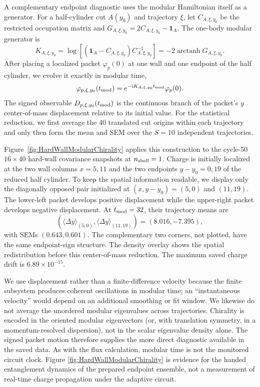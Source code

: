 \documentclass[aps,prb,twocolumn,superscriptaddress,longbibliography,floatfix]{revtex4-2}
\newcommand{\ii}{\mathrm{i}}
\theoremstyle{plain}
\theoremstyle{definition}
\theoremstyle{remark}
\begin{document}
A complementary endpoint diagnostic uses the modular Hamiltonian itself as a
generator.  For a half-cylinder cut $A(y_0)$ and trajectory $\xi$, let
$C_{A,\xi,y_0}$ be the restricted occupation matrix and
$G_{A,\xi,y_0}=2C_{A,\xi,y_0}-\mathbf{1}_A$.  The one-body modular generator is
\begin{equation}
 K_{A,\xi,y_0}
 =\log\!\left[(\mathbf{1}_A-C_{A,\xi,y_0})
 C_{A,\xi,y_0}^{-1}\right]
 =-2\operatorname{arctanh}G_{A,\xi,y_0}.
 \label{eq:EndpointModularGenerator}
\end{equation}
After placing a localized packet $\varphi_p(0)$ at one wall and one endpoint
of the half cylinder, we evolve it exactly in modular time,
\begin{equation}
 \varphi_{p,\xi,y_0}(t_{\rm mod})
 =e^{-\ii K_{A,\xi,y_0}t_{\rm mod}}\varphi_p(0).
 \label{eq:EndpointModularPacketEvolution}
\end{equation}
The signed observable $D_{p,\xi,y_0}(t_{\rm mod})$ is the continuous branch of
the packet's $y$ center-of-mass displacement relative to its initial value.
For the statistical reduction, we first average the 40 translated cut origins
within each trajectory and only then form the mean and SEM over the $S=10$
independent trajectories.

Figure~\ref{fig:HardWallModularChirality} applies this construction to the
cycle-50 $16\times40$ hard-wall covariance snapshots at
$n_{\rm shell}=1$.  Charge is initially localized at the two wall columns
$x=5,11$ and the two endpoints $y-y_0=0,19$ of the reduced half cylinder.
To keep the spatial information readable, we display only the diagonally
opposed pair initialized at $(x,y-y_0)=(5,0)$ and $(11,19)$.  The lower-left
packet develops positive displacement while the upper-right packet develops
negative displacement.  At $t_{\rm mod}=32$, their trajectory means are
\begin{equation}
 (\langle\Delta y\rangle_{(5,0)},
  \langle\Delta y\rangle_{(11,19)})=(8.016,-7.395),
 \label{eq:EndpointModularDisplacements}
\end{equation}
with SEMs $(0.643,0.601)$.  The complementary two corners, not plotted, have
the same endpoint-sign structure.  The density overlay shows the spatial
redistribution before this center-of-mass reduction.  The maximum saved charge
drift is $6.89\times10^{-15}$.

We use displacement rather than a finite-difference velocity because the
finite subsystem produces coherent oscillations in modular time; an
``instantaneous velocity'' would depend on an additional smoothing or fit
window.  We likewise do not average the unordered modular eigenvalues across
trajectories.  Chirality is encoded in the oriented modular eigenvectors (or,
with translation symmetry, in a momentum-resolved dispersion), not in the
scalar eigenvalue density alone.  The signed packet motion therefore supplies
the more direct diagnostic available in the saved data.  As with the flux
calculation, modular time is not the monitored circuit clock.  Figure
\ref{fig:HardWallModularChirality} is evidence for the handed entanglement
dynamics of the prepared endpoint ensemble, not a measurement of real-time
charge propagation under the adaptive circuit.
\end{document}
